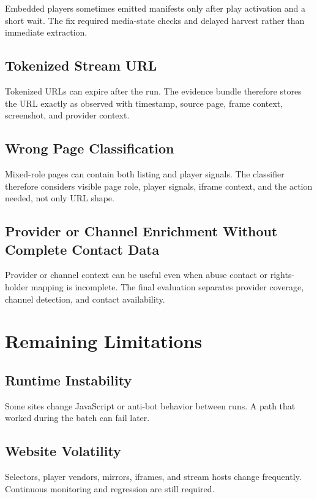Embedded players sometimes emitted manifests only after play activation and a
short wait. The fix required media-state checks and delayed harvest rather than
immediate extraction.

\subsection{Tokenized Stream URL}

Tokenized URLs can expire after the run. The evidence bundle therefore stores
the URL exactly as observed with timestamp, source page, frame context,
screenshot, and provider context.

\subsection{Wrong Page Classification}

Mixed-role pages can contain both listing and player signals. The classifier
therefore considers visible page role, player signals, iframe context, and the
action needed, not only URL shape.

\subsection{Provider or Channel Enrichment Without Complete Contact Data}

Provider or channel context can be useful even when abuse contact or
rights-holder mapping is incomplete. The final evaluation separates provider
coverage, channel detection, and contact availability.

\section{Remaining Limitations}

\subsection{Runtime Instability}

Some sites change JavaScript or anti-bot behavior between runs. A path that
worked during the batch can fail later.

\subsection{Website Volatility}

Selectors, player vendors, mirrors, iframes, and stream hosts change
frequently. Continuous monitoring and regression are still required.

